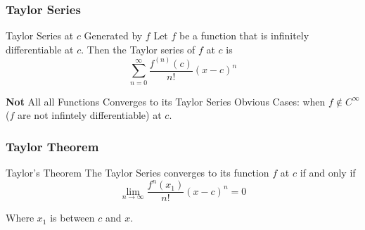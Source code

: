 \documentclass{beamer}
\begin{document}
\begin{frame}
\frametitle{Taylor Series}

\begin{block}{Taylor Series at $c$ Generated by $f$}
	Let $f$ be a function that is infinitely differentiable at $c$. Then the Taylor series of $f$ at $c$ is
	\begin{equation}
		\sum_{n=0}^{\infty} \frac{f^{(n)}(c)}{n!} (x-c)^n
	\end{equation}
\end{block}

\begin{alertblock}{\textbf{Not} All all Functions Converges to its Taylor Series}
	Obvious Cases: when $f \notin C^{\infty}$ ($f$ are not infintely differentiable) at $c$.
\end{alertblock}


%
\end{frame}

\begin{frame}
\frametitle{Taylor Theorem}

\begin{block}{Taylor's Theorem}
	The Taylor Series converges to its function $f$ at $c$ if and only if 
	\[
		\lim_{n \to \infty} \frac{f^n(x_1)}{n!}(x-c)^n = 0
	\]

	Where $x_1$ is between $c$ and $x$.
\end{block}

\end{frame}
\end{document}
